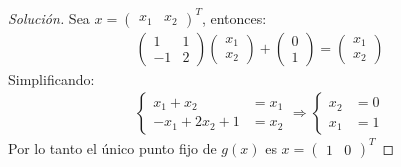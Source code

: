 \documentclass[12pt]{book}
\newenvironment{solucion}
  {\renewcommand\qedsymbol{$\square$}\begin{proof}[Solución]}
  {\end{proof}}
\begin{document}
\begin{solucion}
 Sea $x= \begin{pmatrix}
 x_1&
 x_2
 \end{pmatrix}^T$, entonces:
 \begin{align*}
     \begin{pmatrix}
         1&1\\
         -1&2
     \end{pmatrix}\begin{pmatrix}
         x_1\\
         x_2
     \end{pmatrix} + \begin{pmatrix}
         0\\
         1
     \end{pmatrix} = \begin{pmatrix}
         x_1\\
         x_2
     \end{pmatrix}
 \end{align*}
Simplificando:
\begin{align*}
    \begin{cases}
         x_1 + x_2 &= x_1\\
         -x_1 + 2x_2 + 1 &= x_2
     \end{cases}\Rightarrow \begin{cases}
         x_2&=0\\
         x_1&=1
     \end{cases}
\end{align*}
 Por lo tanto el único punto fijo de $g(x)$ es $x=\begin{pmatrix}
 1&
 0
 \end{pmatrix}^T$
\end{solucion}
\end{document}
